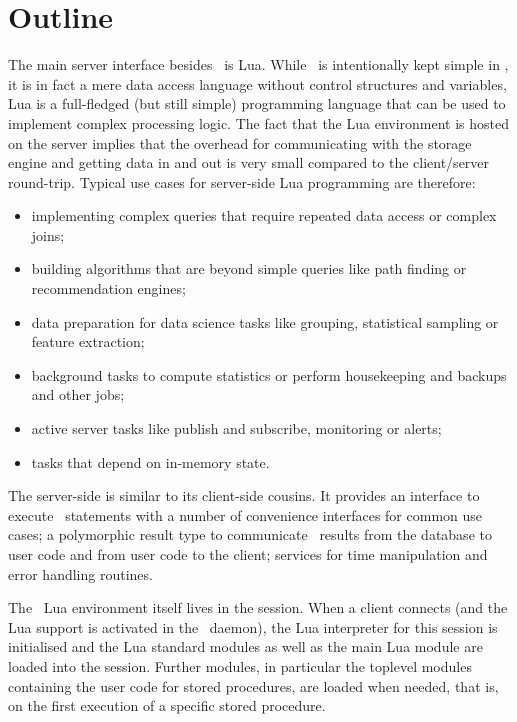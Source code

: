 \section{Outline}
The main server interface
besides \sql\ is Lua.
While \sql\ is intentionally kept simple in \nowdb,
it is in fact a mere data access language
without control structures and variables,
Lua is a full-fledged (but still simple)
programming language that can be used to
implement complex processing logic.
The fact that the Lua environment is hosted
on the server implies that the overhead
for communicating with the storage engine
and getting data in and out is very small
compared to the client/server round-trip.
Typical use cases for server-side Lua programming
are therefore:

\begin{itemize}
\item implementing complex queries that require
      repeated data access or complex joins;
\item building algorithms that are beyond simple queries
      like path finding or recommendation engines; 
\item data preparation for data science tasks
      like grouping, statistical sampling or
       feature extraction; 
\item background tasks to compute statistics or
      perform housekeeping and backups
      and other  jobs;
\item active server tasks like publish and subscribe,
      monitoring or alerts;
\item tasks that depend on in-memory state.
\end{itemize}

The server-side  is similar
to its client-side cousins. It provides
an interface to execute \sql\ statements with
a number of convenience interfaces for common
use cases; a polymorphic result type
to communicate \sql\ results from the database
to user code and
from user code to the client; services for
time manipulation and error handling routines.

The \nowdb\ Lua environment itself
lives in the session.
When a client connects
(and the Lua support
is activated in the \nowdb\ daemon),
the Lua interpreter for this session is initialised
and the Lua standard modules 
as well as the main Lua module are loaded
into the session.
Further modules, in particular the toplevel modules
containing the user code for stored procedures,
are loaded when needed, that is, on the first
execution of a specific stored procedure.


